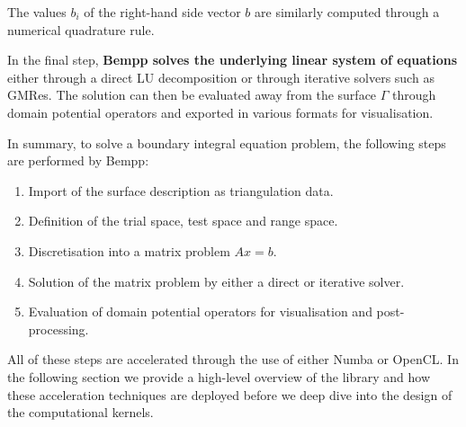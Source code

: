 The values $b_i$ of the right-hand side vector $b$ are similarly computed through a numerical quadrature rule.

In the final step, \textbf{Bempp solves the underlying linear system of equations} either through a direct LU decomposition or through iterative solvers such as GMRes. The solution can then be evaluated away from the surface $\Gamma$ through domain potential operators and exported in various formats for visualisation.

In summary, to solve a boundary integral equation problem, the following steps are performed by Bempp:
\begin{enumerate}
	\item Import of the surface description as triangulation data.
	\item Definition of the trial space, test space and range space.
	\item Discretisation into a matrix problem $Ax=b$.
	\item Solution of the matrix problem by either a direct or iterative solver.
	\item Evaluation of domain potential operators for visualisation and post-processing.
\end{enumerate}

All of these steps are accelerated through the use of either Numba or OpenCL. In the following section we provide a high-level overview of the library and how these acceleration techniques are deployed before we deep dive into the design of the computational kernels.
